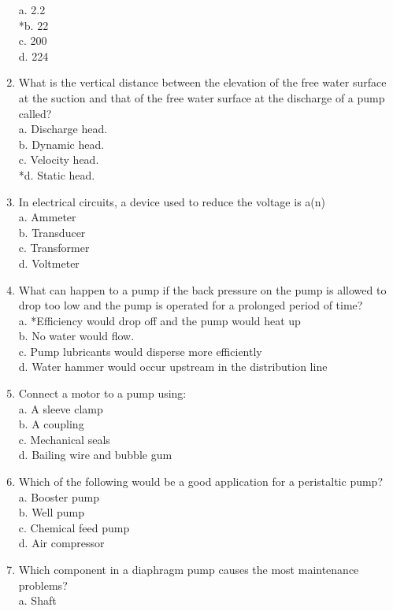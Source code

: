 \begin{enumerate}[1.]
a. 2.2\\
*b. 22\\
c. 200\\
d. 224\\
\item What is the vertical distance between the elevation of the free water surface at the suction and that of the free water surface at the discharge of a pump called?\\
a. Discharge head.\\
b. Dynamic head.\\
c. Velocity head.\\
*d. Static head.\\
\item In electrical circuits, a device used to reduce the voltage is a(n)\\
a. Ammeter\\
b. Transducer\\
c. Transformer\\
d. Voltmeter\\
\item What can happen to a pump if the back pressure on the pump is allowed to drop too low and the pump is operated for a prolonged period of time?\\
a. *Efficiency would drop off and the pump would heat up\\
b. No water would flow.\\
c. Pump lubricants would disperse more efficiently\\
d. Water hammer would occur upstream in the distribution line\\
\item Connect a motor to a pump using:\\
a. A sleeve clamp\\
b. A coupling\\
c. Mechanical seals\\
d. Bailing wire and bubble gum\\
\item Which of the following would be a good application for a peristaltic pump?\\
a. Booster pump\\
b. Well pump\\
c. Chemical feed pump\\
d. Air compressor\\
\item Which component in a diaphragm pump causes the most maintenance problems?\\
a. Shaft\\

\end{enumerate}
